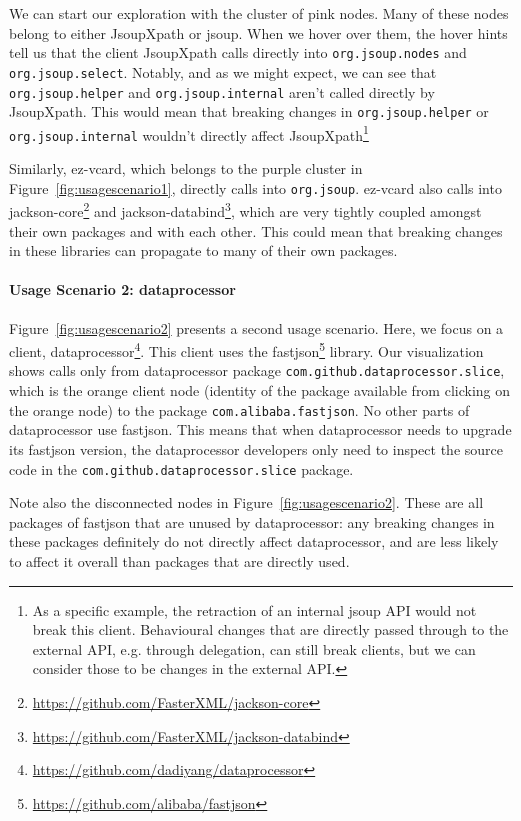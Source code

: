 We can start our exploration with the cluster of pink nodes. Many of these nodes belong to either JsoupXpath or jsoup. When we hover over them, the hover hints tell us that the client JsoupXpath calls directly into \texttt{org.jsoup.nodes} and \texttt{org.jsoup.select}. Notably, and as we might expect, we can see that \texttt{org.jsoup.helper} and \texttt{org.jsoup.internal} aren't called directly by JsoupXpath. This would mean that breaking changes in \texttt{org.jsoup.helper} or \texttt{org.jsoup.internal} wouldn't directly affect JsoupXpath\footnote{As a specific example, the retraction of an internal jsoup API would not break this client. Behavioural changes that are directly passed through to the external API, e.g. through delegation, can still break clients, but we can consider those to be changes in the external API.} 

Similarly, ez-vcard, which belongs to the purple cluster in Figure~\ref{fig:usagescenario1}, directly calls into \texttt{org.jsoup}. ez-vcard also calls into jackson-core\footnote{\url{https://github.com/FasterXML/jackson-core}\label{jackson-core}} and jackson-databind\footnote{\url{https://github.com/FasterXML/jackson-databind}\label{jackson-databind}}, which are very tightly coupled amongst their own packages and with each other. This could mean that breaking changes in these libraries can propagate to many of their own packages.

\paragraph{Usage Scenario 2: dataprocessor}

Figure~\ref{fig:usagescenario2} presents a second usage scenario. Here, we focus on a client, dataprocessor\footnote{\url{https://github.com/dadiyang/dataprocessor}\label{dataprocessor}}. This client uses the fastjson\footnote{\url{https://github.com/alibaba/fastjson}\label{fastjson}} library. Our visualization shows calls only from dataprocessor package \texttt{com.github.dataprocessor.slice}, which is the orange client node (identity of the package available from clicking on the orange node) to the package \texttt{com.alibaba.fastjson}. No other parts of dataprocessor use fastjson. This means that when dataprocessor needs to upgrade its fastjson version, the dataprocessor developers only need to inspect the source code in the \texttt{com.github.dataprocessor.slice} package. 

Note also the disconnected nodes in Figure~\ref{fig:usagescenario2}. These are all packages of fastjson that are unused by dataprocessor: any breaking changes in these packages definitely do not directly affect dataprocessor, and are less likely to affect it overall than packages that are directly used.
